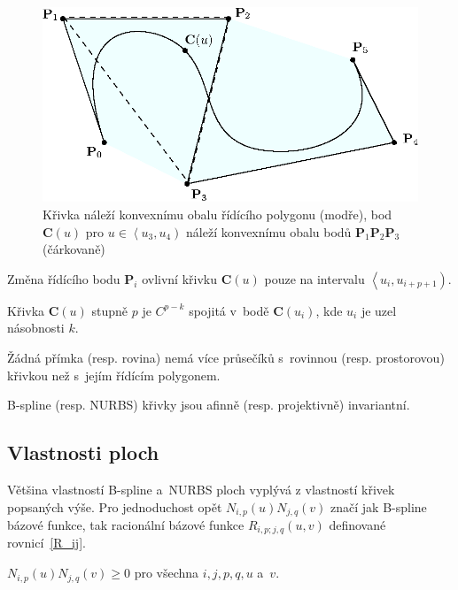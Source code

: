 \begin{figure}[!h]
	\begin{center}
		\includegraphics*[]{obr/convex}
	\end{center}
	\caption[caption]{\centering Křivka náleží konvexnímu obalu řídícího polygonu (modře), bod $\mathbf{C}\left(u\right)$ pro $u\in\left\langle u_3,u_4\right) $ náleží konvexnímu obalu bodů $\mathbf{P}_1\mathbf{P}_2\mathbf{P}_3$ (čárkovaně)}
	\label{obrConvex}
\end{figure}

\begin{veta}
	\label{local-modif}
	Změna řídícího bodu $\mathbf{P}_i$ ovlivní křivku $\mathbf{C}\left(u\right)$ pouze na intervalu $\left\langle u_i, u_{i+p+1}\right) $.
\end{veta}

\begin{veta}
	Křivka $\mathbf{C}\left(u\right)$ stupně $p$ je $C^{p-k}$ spojitá v~bodě $\mathbf{C}\left(u_i\right)$, kde $u_i$ je uzel násobnosti $k$.
\end{veta}

\begin{veta}
	Žádná přímka (resp. rovina) nemá více průsečíků s~rovinnou (resp. prostorovou) křivkou než s~jejím řídícím polygonem.
\end{veta}

\begin{veta}[Invariance]\label{invariance}
	B-spline (resp. NURBS) křivky jsou afinně (resp. projektivně) invariantní.
\end{veta}

\subsection{Vlastnosti ploch}
Většina vlastností B-spline a~NURBS ploch vyplývá z vlastností křivek popsaných výše. Pro jednoduchost opět $N_{i,p}\left(u\right)N_{j,q}\left(v\right)$ značí jak B-spline bázové funkce, tak racionální bázové funkce $R_{i,p;j,q}\left(u,v\right)$ definované rovnicí~\ref{R_ij}.
\begin{veta}[Nezápornost]
	${N}_{i,p}\left(u\right){N}_{j,q}\left(v\right)\geq 0$ pro všechna $i, j, p, q, u$ a~$v$.
\end{veta}

